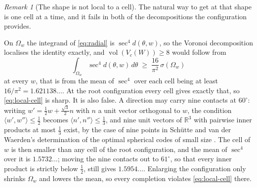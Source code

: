 \documentclass[11pt,reqno]{amsart}
\renewcommand{\_}{\origunderscore\allowbreak}
\numberwithin{equation}{section}
\theoremstyle{plain}
\theoremstyle{definition}
\theoremstyle{remark}
\newtheorem{remark}[thm]{Remark}
\DeclareMathOperator{\vol}{vol}
\begin{document}
\begin{remark}[The shape is not local to a cell]\label{rem:no-local-cell}
The natural way to get at that shape is one cell at a time, and it fails
in both of the decompositions the configuration provides.

On $\Omega_w$ the integrand of \eqref{eq:radial} is $\sec^4d(\theta,w)$,
so the Voronoi decomposition localises the identity exactly, and
$\vol(V_c(W))\ge8$ would follow from
\begin{equation}\label{eq:local-cell}
  \int_{\Omega_w}\sec^4 d(\theta,w)\,d\theta
  \;\ge\;\frac{16}{\pi^2}\,\sigma(\Omega_w)
\end{equation}
at every $w$, that is from the mean of $\sec^4$ over each cell being at
least $16/\pi^2=1.621138\ldots$. At the root configuration every cell
gives exactly that, so \eqref{eq:local-cell} is sharp. It is also false.
A direction may carry nine contacts at $60^\circ$: writing
$w'=\tfrac12 w+\tfrac{\sqrt3}{2}n$ with $n$ a unit vector orthogonal to
$w$, the condition $\langle w',w''\rangle\le\tfrac12$ becomes
$\langle n',n''\rangle\le\tfrac13$, and nine unit vectors of
$\mathbb{R}^3$ with pairwise inner products at most $\tfrac13$ exist, by
the case of nine points in Sch\"utte and van der Waerden's determination
of the optimal spherical codes of small size \cite{SW51}. The cell of
$w$ is then smaller than any cell of the root configuration, and the
mean of $\sec^4$ over it is $1.5732\ldots$; moving the nine contacts out
to $61^\circ$, so that every inner product is strictly below
$\tfrac12$, still gives $1.5954\ldots$. Enlarging the configuration only
shrinks $\Omega_w$ and lowers the mean, so every completion violates
\eqref{eq:local-cell} there.


\end{remark}
\end{document}
